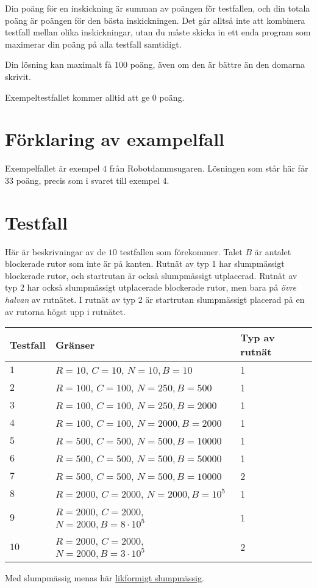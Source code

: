 Din poäng för en inskickning är summan av poängen för testfallen, och din totala poäng är poängen för den bästa inskickningen.
Det går alltså inte att kombinera testfall mellan olika inskickningar, utan du måste skicka in ett enda program som
maximerar din poäng på alla testfall samtidigt.

Din lösning kan maximalt få $100$ poäng, även om den är bättre än den domarna skrivit.

Exempeltestfallet kommer alltid att ge $0$ poäng.


\section*{Förklaring av exampelfall}
Exempelfallet är exempel $4$ från Robotdammsugaren. Lösningen som står här får $33$ poäng, precis
som i svaret till exempel $4$.

\section*{Testfall}
Här är beskrivningar av de $10$ testfallen som förekommer. Talet $B$ är antalet blockerade rutor som inte är på kanten.
Rutnät av typ 1 har slumpmässigt blockerade rutor, och startrutan är också slumpmässigt utplacerad.
Rutnät av typ 2 har också slumpmässigt utplacerade blockerade rutor, men bara på \textit{övre halvan}
av rutnätet. I rutnät av typ 2 är startrutan slumpmässigt placerad på en av rutorna högst upp i rutnätet.

\noindent
\begin{tabular}{| l | l | l |}
\hline
Testfall & Gränser                                     & Typ av rutnät \\ \hline
$1$       & $R = 10$, $C = 10$, $N = 10, B = 10$           & 1  \\ \hline
$2$       & $R = 100$, $C = 100$, $N = 250, B = 500$         & 1   \\ \hline
$3$       & $R = 100$, $C = 100$, $N = 250, B = 2000$     & 1   \\ \hline
$4$       & $R = 100$, $C = 100$, $N = 2000, B = 2000$ & 1  \\ \hline
$5$       & $R = 500$, $C = 500$, $N = 500, B = 10000$    & 1   \\ \hline
$6$       & $R = 500$, $C = 500$, $N = 500, B = 50000$   & 1   \\ \hline
$7$       & $R = 500$, $C = 500$, $N = 500, B = 10000$    & 2   \\ \hline
$8$       & $R = 2000$, $C = 2000$, $N = 2000, B = 10^5$  & 1  \\ \hline
$9$       & $R = 2000$, $C = 2000$, $N = 2000, B = 8 \cdot 10^5$ & 1   \\ \hline
$10$      & $R = 2000$, $C = 2000$, $N = 2000, B = 3 \cdot 10^5$ & 2   \\ \hline
\end{tabular}

Med slumpmässig menas här \href{https://sv.wikipedia.org/wiki/Likformig_sannolikhetsf\%C3\%B6rdelning}{likformigt slumpmässig}. 
